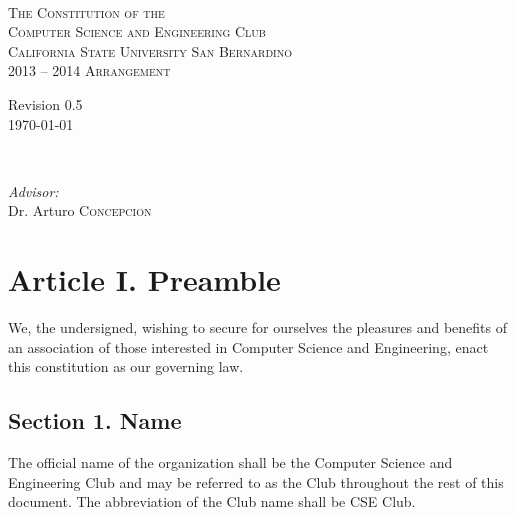 \documentclass{article}
\begin{document}
\begin{titlepage}
\begin{center}

~ \\[2cm]
\textsc{\LARGE The Constitution of the}\\[0.5cm]
\textsc{\LARGE Computer Science and Engineering Club}\\[1.0cm]
\textsc{\large California State University San Bernardino}\\[5cm]
\textsc{\Large 2013 -- 2014 Arrangement}\\[10cm]

\begin{minipage}{0.4\textwidth}
\begin{flushleft} \large
Revision 0.5 \\
\today
\end{flushleft}
\end{minipage}
~
\begin{minipage}{0.55\textwidth}
\begin{flushright} \large
\emph{Advisor:} \\
Dr. Arturo \textsc{Concepcion}\\
\end{flushright}
\end{minipage}
\end{center}
\end{titlepage}

\newpage
\tableofcontents

\newpage

\section{Article I. Preamble}
  We, the undersigned, wishing to secure for ourselves the pleasures and benefits of an association of those interested in Computer Science and Engineering, enact this constitution as our governing law.

  \subsection{Section 1. Name}
    The official name of the organization shall be the Computer Science and Engineering Club and may be referred to as the Club throughout the rest of this document. The abbreviation of the Club name shall be CSE Club.
\end{document}
